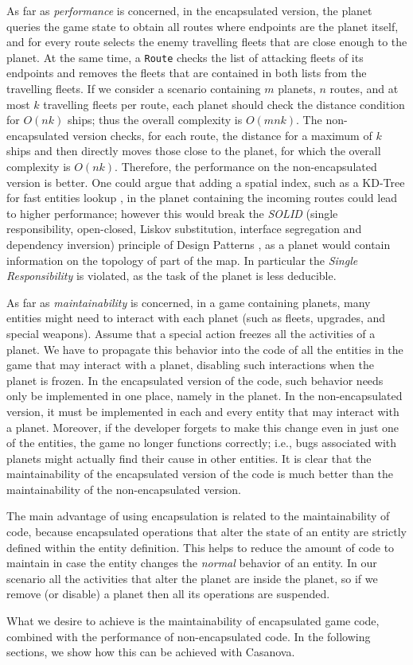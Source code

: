 As far as \emph{performance} is concerned, in the encapsulated version, the planet queries the game state to obtain all routes where endpoints are the planet itself, and for every route selects the enemy travelling fleets that are close enough to the planet. At the same time, a \texttt{Route} checks the list of attacking fleets of its endpoints and removes the fleets that are contained in both lists from the travelling fleets. If we consider a scenario containing $m$ planets, $n$ routes, and at most $k$ travelling fleets per route, each planet should check the distance condition for $O(nk)$ ships; thus the overall complexity is $O(mnk)$. The non-encapsulated version checks, for each route, the distance for a maximum of $k$ ships and then directly moves those close to the planet, for which the overall complexity is $O(nk)$. Therefore, the performance on the non-encapsulated version is better. One could argue that adding a spatial index, such as a KD-Tree for fast entities lookup \cite{white2007scaling}, in the planet containing the incoming routes could lead to higher performance; however this would break the \textit{SOLID} (single responsibility, open-closed, Liskov substitution, interface segregation and dependency inversion) principle of Design Patterns \cite{martin2003agile}, as a planet would contain information on the topology of part of the map. In particular the \textit{Single Responsibility} is violated, as the task of the planet is less deducible.

As far as \emph{maintainability} is concerned, in a game containing planets, many entities might need to interact with each planet (such as fleets, upgrades, and special weapons). Assume that a special action freezes all the activities of a planet. We have to propagate this behavior into the code of all the entities in the game that may interact with a planet, disabling such interactions when the planet is frozen. In the encapsulated version of the code, such behavior needs only be implemented in one place, namely in the planet. In the non-encapsulated version, it must be implemented in each and every entity that may interact with a planet. Moreover, if the developer forgets to make this change even in just one of the entities, the game no longer functions correctly; i.e., bugs associated with planets might actually find their cause in other entities. It is clear that the maintainability of the encapsulated version of the code is much better than the maintainability of the non-encapsulated version.

The main advantage of using encapsulation is related to the maintainability of code, because encapsulated operations that alter the state of an entity are strictly defined within the entity definition. This helps to reduce the amount of code to maintain in case the entity changes the \textit{normal} behavior of an entity. In our scenario all the activities that alter the planet are inside the planet, so if we remove (or disable) a planet then all its operations are suspended.

What we desire to achieve is the maintainability of encapsulated game code, combined with the performance of non-encapsulated code. In the following sections, we show how this can be achieved with Casanova. 